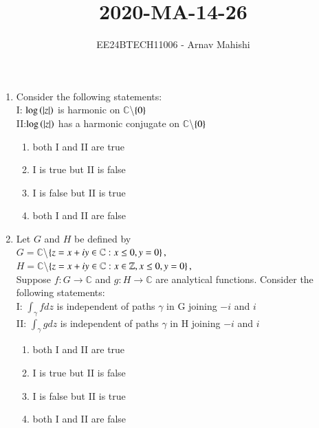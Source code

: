 \documentclass[journal]{IEEEtran}
\begin{document}

\vspace{3cm}

\title{2020-MA-14-26}
\author{EE24BTECH11006 - Arnav Mahishi}
{\let\newpage\relax\maketitle}
\begin{enumerate}
\item{
Consider the following statements:\\
I: $\log\left(\left\vert z\right\vert\right)$ is harmonic on $\mathbb{C}$\textbackslash$\left\{0\right\}$\\
II:$\log\left(\left\vert z\right\vert\right)$ has a harmonic conjugate on $\mathbb{C}$\textbackslash$\left\{0\right\}$
\begin{multicols}{2}
\begin{enumerate}
\item both I and II are true
\item I is true but II is false
\item I is false but II is true
\item both I and II are false
\end{enumerate}
\end{multicols}
}
\item{
Let $G$ and $H$ be defined by\\
$G=\mathbb{C}$\textbackslash$\left\{z=x+iy\in\mathbb{C}:x\leq 0,y=0\right\},$\\
$H=\mathbb{C}$\textbackslash$\left\{z=x+iy\in\mathbb{C}:x\in\mathbb{Z},x\leq 0,y=0\right\},$\\
Suppose $f:G\rightarrow\mathbb{C}$ and $g:H\rightarrow\mathbb{C}$ are analytical functions. Consider the following statements:\\
I: $\int_{\gamma}fdz$ is independent of paths $\gamma$ in G joining $-i$ and $i$\\
II: $\int_{\gamma}gdz$ is independent of paths $\gamma$ in H joining $-i$ and $i$
\begin{multicols}{2}
\begin{enumerate}
\item both I and II are true
\item I is true but II is false
\item I is false but II is true
\item both I and II are false

\end{enumerate}
\end{multicols}}
\end{enumerate}
\end{document}
